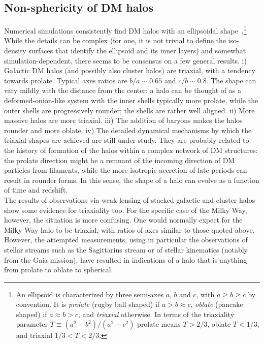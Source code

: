 \subsection{Non-sphericity of DM halos}\label{sec:nonSphericalHalo} 
Numerical simulations consistently find DM halos with an ellipsoidal shape~\cite{haloshape}.\footnote{An ellipsoid is characterized by three semi-axes $a$, $b$ and $c$, with $a \ge b \ge c$ by convention. It is {\em prolate} (rugby ball shaped) if $a > b \approx c$, {\em oblate} (pancake shaped) if $a \approx b > c$, and {\em triaxial} otherwise. In terms of the triaxiality parameter $T \equiv (a^2-b^2)/(a^2-c^2)$ prolate means $T > 2/3$, oblate $T < 1/3$, and triaxial $1/3 < T < 2/3$.} 
While the details can be complex (for one, it is not trivial to define the iso-density surfaces that identify the ellipsoid and its inner layers) and somewhat simulation-dependent, there seems to be consensus on a few general results. i) Galactic DM halos (and possibly also cluster halos) are triaxial, with a tendency towards prolate. Typical axes ratios are $b/a \sim 0.65$ and $c/b \sim 0.8$.
The shape can vary mildly  with the distance from the center: a halo can be thought of as a deformed-onion-like system with the inner shells  typically more prolate, while the outer shells  are progressively rounder; the shells are rather well aligned. ii) More massive halos are more triaxial. iii) The addition of baryons makes the halos rounder and more oblate. iv) The detailed dynamical mechanisms by which the triaxial shapes are achieved are still under study. They are probably related to the history of formation of the halos within a complex network of DM structures: the prolate direction might be a remnant of the incoming direction of DM particles from filaments, while the more isotropic accretion of late periods can result in rounder forms. In this sense, the shape of a halo can evolve as a function of time and redshift.\\
The results of observations via weak lensing of stacked galactic and cluster halos show some evidence for triaxiality too. For the specific case of the Milky Way, however, the situation is more confusing. One would normally expect for the Milky Way halo to be triaxial, with ratios of axes similar to those quoted above. However, the attempted measurements, using in particular the observations of stellar streams such as the Sagittarius stream or of stellar kinematics (notably from the {\sc Gaia} mission), have resulted in indications of a halo that is anything from prolate to oblate to spherical. 

